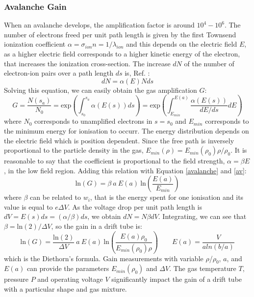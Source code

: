 \subsubsection{Avalanche Gain}
When an avalanche develops, the amplification factor is around $10^4-10^6$. The number of electrons freed per unit path length is given
by the first Townsend ionization coefficient $\alpha=\sigma_{ion}n=1/\lambda_{ion}$ and this depends on the electric field $E$, 
as a higher electric field corresponds to a higher kinetic energy of the electron, that increases the ionization cross-section.
The increase $dN$ of the number of electron-ion pairs over a path length $ds$ is, Ref. \cite{kola}:
\begin{equation}
    dN=\alpha(E)Nds
\end{equation}
Solving this equation, we can easily obtain the gas amplification $G$:
\begin{equation}\label{av}
    G=\frac{N(s_a)}{N_0}=\text{exp} \left( \int_{s_0}^{s_a} \alpha(E(s)) ds \right)=\text{exp} \left( \int_{E_{min}}^{E(a)} \frac{\alpha(E(s))}{dE/ds} dE \right)
\end{equation}
where $N_0$ corresponds to unamplified electrons in $s=s_0$ and $E_{min}$ corresponds to the minimum energy 
for ionisation to occurr. The energy distribution depends on the electric field which is position dependent. 
Since the free path is inversely proportional to the particle density in the gas, $E_{min}(\rho)=E_{min}(\rho_0)\rho/\rho_0$.
It is reasonable to say that the coefficient is proportional to the field strength, $\alpha= \beta E$, in the low field region. 
Adding this relation with Equation \ref{avalanche} and \ref{av}:
\begin{equation}
     \text{ln}(G)=\beta \ a \ E(a) \ \text{ln}\left( \frac{E(a)}{E_{min}}\right)
\end{equation}
where $\beta$ can be related to $w_i$, that is the energy spent for one ionisation and its value is equal to $e \Delta V$.
As the voltage drop per unit path length is $dV = E(s)ds = (\alpha/\beta)ds$, we obtain $dN=N \beta dV$. Integrating, we can see that
$\beta= \text{ln}(2)/\Delta V$, so the gain in a drift tube is:
\begin{equation}\label{XXX}
     \text{ln}(G)=\frac{ \text{ln}(2)}{\Delta V} \ a \ E(a)  \ \text{ln}\left( \frac{E(a)\rho_0}{E_{min}(\rho_0)\rho}\right) \qquad E(a)=\frac{V}{a ln(b/a)}
\end{equation}
which is the Diethorn's formula. 
Gain measurements with variable $\rho$/$\rho_0$, $a$, and $E(a)$ can provide the parameters $E_{min} (\rho_0)$ and $\Delta V$. 
The gas temperature $T$, pressure $P$ and operating voltage $V$ significantly impact the gain of a drift tube with a particular shape and gas mixture. 
